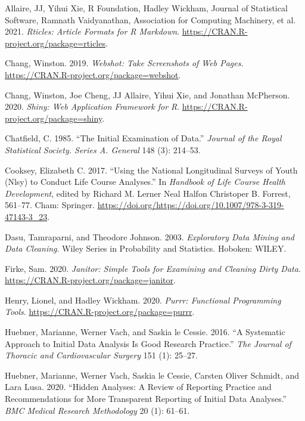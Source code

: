 \documentclass{article}
\begin{document}
\hypertarget{refs}{}
\leavevmode\hypertarget{ref-rticles}{}%
Allaire, JJ, Yihui Xie, R Foundation, Hadley Wickham, Journal of Statistical Software, Ramnath Vaidyanathan, Association for Computing Machinery, et al. 2021. \emph{Rticles: Article Formats for R Markdown}. \url{https://CRAN.R-project.org/package=rticles}.

\leavevmode\hypertarget{ref-webshot}{}%
Chang, Winston. 2019. \emph{Webshot: Take Screenshots of Web Pages}. \url{https://CRAN.R-project.org/package=webshot}.

\leavevmode\hypertarget{ref-shiny}{}%
Chang, Winston, Joe Cheng, JJ Allaire, Yihui Xie, and Jonathan McPherson. 2020. \emph{Shiny: Web Application Framework for R}. \url{https://CRAN.R-project.org/package=shiny}.

\leavevmode\hypertarget{ref-Chatfield1985TIEo}{}%
Chatfield, C. 1985. ``The Initial Examination of Data.'' \emph{Journal of the Royal Statistical Society. Series A. General} 148 (3): 214--53.

\leavevmode\hypertarget{ref-eliznlsy}{}%
Cooksey, Elizabeth C. 2017. ``Using the National Longitudinal Surveys of Youth (Nlsy) to Conduct Life Course Analyses.'' In \emph{Handbook of Life Course Health Development}, edited by Richard M. Lerner Neal Halfon Christoper B. Forrest, 561--77. Cham: Springer. \url{https://doi.org/https://doi.org/10.1007/978-3-319-47143-3_23}.

\leavevmode\hypertarget{ref-DasuTamraparni2003Edma}{}%
Dasu, Tamraparni, and Theodore Johnson. 2003. \emph{Exploratory Data Mining and Data Cleaning}. Wiley Series in Probability and Statistics. Hoboken: WILEY.

\leavevmode\hypertarget{ref-janitor}{}%
Firke, Sam. 2020. \emph{Janitor: Simple Tools for Examining and Cleaning Dirty Data}. \url{https://CRAN.R-project.org/package=janitor}.

\leavevmode\hypertarget{ref-purrr}{}%
Henry, Lionel, and Hadley Wickham. 2020. \emph{Purrr: Functional Programming Tools}. \url{https://CRAN.R-project.org/package=purrr}.

\leavevmode\hypertarget{ref-HuebnerMariannePhD2016Asat}{}%
Huebner, Marianne, Werner Vach, and Saskia le Cessie. 2016. ``A Systematic Approach to Initial Data Analysis Is Good Research Practice.'' \emph{The Journal of Thoracic and Cardiovascular Surgery} 151 (1): 25--27.

\leavevmode\hypertarget{ref-HuebnerMarianne2020Haar}{}%
Huebner, Marianne, Werner Vach, Saskia le Cessie, Carsten Oliver Schmidt, and Lara Lusa. 2020. ``Hidden Analyses: A Review of Reporting Practice and Recommendations for More Transparent Reporting of Initial Data Analyses.'' \emph{BMC Medical Research Methodology} 20 (1): 61--61.
\end{document}

